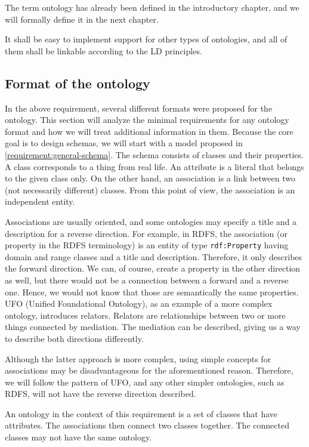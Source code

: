 The term ontology has already been defined in the introductory chapter, and we will formally define it in the next chapter.

It shall be easy to implement support for other types of ontologies, and all of them shall be linkable according to the LD principles.

\subsection{Format of the ontology}

In the above requirement, several different formats were proposed for the ontology. This section will analyze the minimal requirements for any ontology format and how we will treat additional information in them. Because the core goal is to design schemas, we will start with a model proposed in \autoref{requirement:general-schema}. The schema consists of classes and their properties. A class corresponds to a thing from real life. An attribute is a literal that belongs to the given class only. On the other hand, an association is a link between two (not necessarily different) classes. From this point of view, the association is an independent entity.

Associations are usually oriented, and some ontologies may specify a title and a description for a reverse direction. For example, in RDFS, the association (or property in the RDFS terminology) is an entity of type {\tt rdf:Property} having domain and range classes and a title and description. Therefore, it only describes the forward direction. We can, of course, create a property in the other direction as well, but there would not be a connection between a forward and a reverse one. Hence, we would not know that those are semantically the same properties. UFO (Unified Foundational Ontology), as an example of a more complex ontology, introduces relators. Relators are relationships between two or more things connected by mediation. The mediation can be described, giving us a way to describe both directions differently.

Although the latter approach is more complex, using simple concepts for associations may be disadvantageous for the aforementioned reason. Therefore, we will follow the pattern of UFO, and any other simpler ontologies, such as RDFS, will not have the reverse direction described.

\medskip

An ontology in the context of this requirement is a set of classes that have attributes. The associations then connect two classes together. The connected classes may not have the same ontology.


